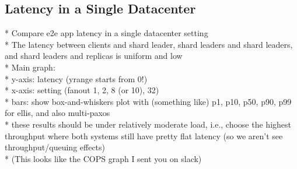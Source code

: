 


%


\subsection{Latency in a Single Datacenter}
* Compare e2e app latency in a single datacenter setting\\
* The latency between clients and shard leader, shard leaders and shard leaders,  and shard leaders and replicas is uniform and low\\

* Main graph:\\
* y-axis: latency (yrange starts from 0!)\\
* x-axis: setting (fanout 1, 2, 8 (or 10), 32)\\
* bars: show box-and-whiskers plot with (something like) p1, p10, p50, p90, p99 for ellis, and also multi-paxos\\
* these results should be under relatively moderate load, i.e., choose the highest throughput where both systems still have pretty flat latency (so we aren't see throughput/queuing effects)\\
* (This looks like the COPS graph I sent you on slack)\\


